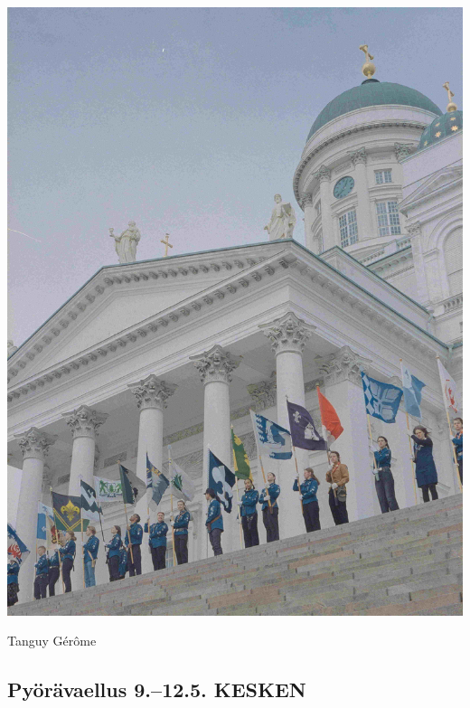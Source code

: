 \documentclass[10pt,finnish,a5paper,headings=small,twoside=semi]{scrartcl}
\begin{document}
\begin{multicols}{2}
	\begin{center}
		\noindent\includegraphics[width=0.9\linewidth]{assets/paraati3}
	\end{center}


\end{multicols}


\medskip
\noindent\null\hfill Tanguy Gérôme



\clearpage
\subsection{Pyörävaellus 9.–12.5. KESKEN}
\end{document}
